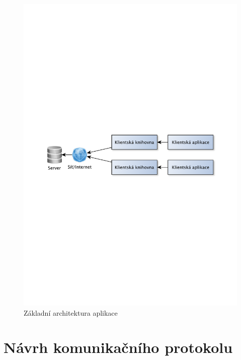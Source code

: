 \begin{figure}[h]
\centering
\includegraphics[trim=12cm 12cm 12cm 12cm, scale=0.8]{fig/princip}
\caption{Základní architektura aplikace} %
\label{fig:architektura}
\end{figure}

\newpage
\section{Návrh komunikačního protokolu}
\label{navrh_protokol}

